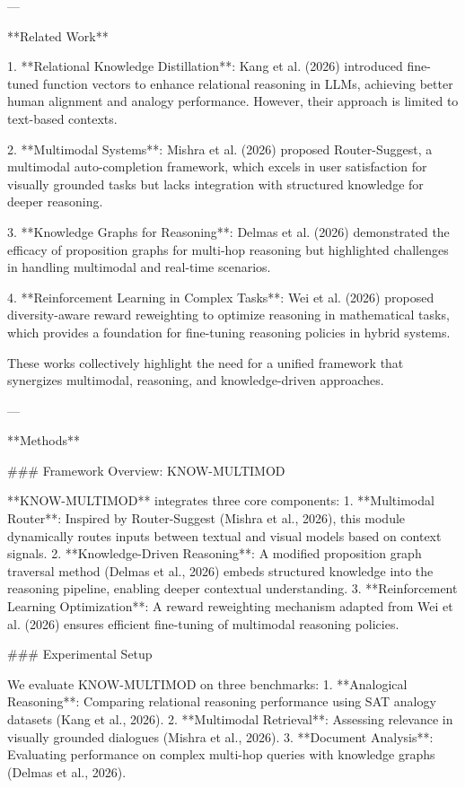 ---

**Related Work**

1. **Relational Knowledge Distillation**: Kang et al. (2026) introduced fine-tuned function vectors to enhance relational reasoning in LLMs, achieving better human alignment and analogy performance. However, their approach is limited to text-based contexts.
   
2. **Multimodal Systems**: Mishra et al. (2026) proposed Router-Suggest, a multimodal auto-completion framework, which excels in user satisfaction for visually grounded tasks but lacks integration with structured knowledge for deeper reasoning.

3. **Knowledge Graphs for Reasoning**: Delmas et al. (2026) demonstrated the efficacy of proposition graphs for multi-hop reasoning but highlighted challenges in handling multimodal and real-time scenarios.

4. **Reinforcement Learning in Complex Tasks**: Wei et al. (2026) proposed diversity-aware reward reweighting to optimize reasoning in mathematical tasks, which provides a foundation for fine-tuning reasoning policies in hybrid systems.

These works collectively highlight the need for a unified framework that synergizes multimodal, reasoning, and knowledge-driven approaches.

---

**Methods**

### Framework Overview: KNOW-MULTIMOD

**KNOW-MULTIMOD** integrates three core components:
1. **Multimodal Router**: Inspired by Router-Suggest (Mishra et al., 2026), this module dynamically routes inputs between textual and visual models based on context signals.
2. **Knowledge-Driven Reasoning**: A modified proposition graph traversal method (Delmas et al., 2026) embeds structured knowledge into the reasoning pipeline, enabling deeper contextual understanding.
3. **Reinforcement Learning Optimization**: A reward reweighting mechanism adapted from Wei et al. (2026) ensures efficient fine-tuning of multimodal reasoning policies.

### Experimental Setup

We evaluate KNOW-MULTIMOD on three benchmarks:
1. **Analogical Reasoning**: Comparing relational reasoning performance using SAT analogy datasets (Kang et al., 2026).
2. **Multimodal Retrieval**: Assessing relevance in visually grounded dialogues (Mishra et al., 2026).
3. **Document Analysis**: Evaluating performance on complex multi-hop queries with knowledge graphs (Delmas et al., 2026).

